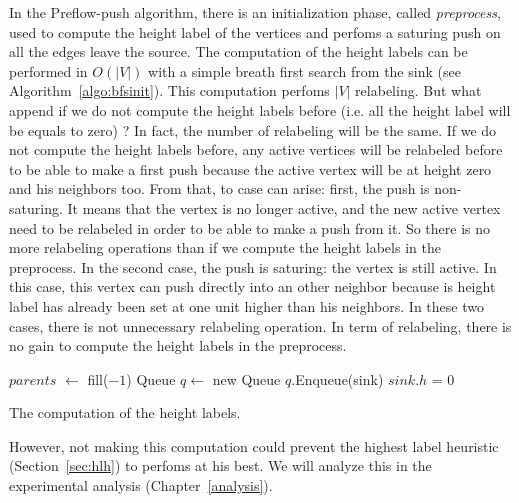 In the Preflow-push algorithm, there is an initialization phase, called \textit{preprocess}, used to compute the height label of the vertices and perfoms a saturing push on all the edges leave the source. The computation of the height labels can be performed in $O(|V|)$ with a simple breath first search from the sink (see Algorithm~\ref{algo:bfsinit}). This computation perfoms $|V|$ relabeling. But what append if we do not compute the height labels before (i.e. all the height label will be equals to zero) ? In fact, the number of relabeling will be the same. If we do not compute the height labels before, any active vertices will be relabeled before to be able to make a first push because the active vertex will be at height zero and his neighbors too. From that, to case can arise: first, the push is non-saturing. It means that the vertex is no longer active, and the new active vertex need to be relabeled in order to be able to make a push from it. So there is no more relabeling operations than if we compute the height labels in the preprocess. In the second case, the push is saturing: the vertex is still active. In this case, this vertex can push directly into an other neighbor because is height label has already been set at one unit higher than his neighbors. In these two cases, there is not unnecessary relabeling operation. In term of relabeling, there is no gain to compute the height labels in the preprocess. \\

\begin{algorithm}
$parents$ $\gets$ fill($-1$)\;
Queue $q\gets$ new Queue\;
$q$.Enqueue(sink)\;
$sink.h$ = 0\;

\caption{The computation of the height labels.}
\label{algo:bfsinit}
\end{algorithm}

However, not making this computation could prevent the highest label heuristic (Section~\ref{sec:hlh}) to perfoms at his best. We will analyze this in the experimental analysis (Chapter~\ref{analysis}).






